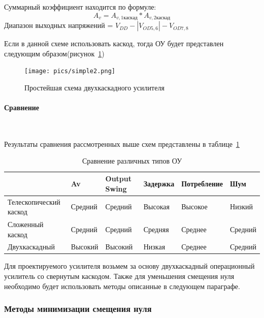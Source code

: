 \documentclass[a4paper,12pt,oneside]{scrartcl}
\begin{document}
Суммарный коэффициент находится по формуле:
$$A_{v}= A_{v,1 каскад}* A_{v,2 каскад}$$
Диапазон выходных напряжений = $V_{DD} - |V_{OD5,6}|- V_{OD7,8}$

Если в данной схеме использовать каскод, тогда ОУ будет представлен следующим образом(рисунок~\ref{fig:simple2})
\begin{figure}[!htb]
\centering
\texttt{[image: pics/simple2.png]}
\caption{Простейшая схема двухкаскадного усилителя}
\label{fig:simple2}
\end{figure}
\FloatBarrier















\paragraph{Сравнение}~~~~~~~~~~~~~~~~~~~~~~~~~~~~~

Результаты сравнения рассмотренных выше схем представлены в таблице~\ref{Compare}
\begin{table}[!htb]
\centering
\caption{Сравнение различных типов ОУ}
\label{Compare}
    \begin{tabular}{|l|l|l|l|l|l|}
    \hline
                           & Av      & Output Swing & Задержка & Потребление & Шум     \\ \hline
    Телескопический каскод & Средний & Средний      & Высокая  & Высокое     & Низкий  \\
    Сложенный каскод       & Средний & Средний      & Средняя  & Среднее     & Средний \\
    Двухкаскадный          & Высокий & Высокий      & Низкая   & Среднее     & Средний  \\ \hline
    \end{tabular}
\end{table}

Для проектируемого усилителя возьмем за основу двухкаскадный операционный усилитель со свернутым каскодом. Также для уменьшения смещения нуля необходимо будет использовать методы описанные в следующем параграфе.~\cite{B13}









\subsubsection{Методы минимизации смещения нуля}
\end{document}
